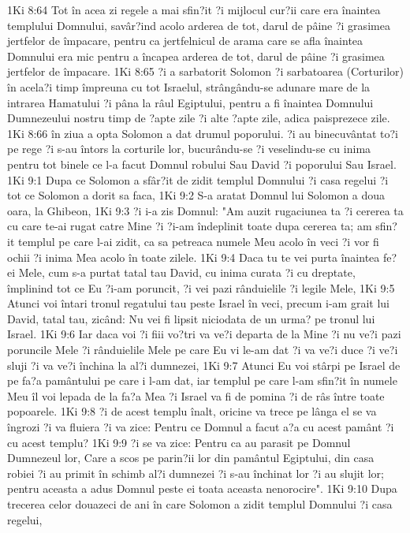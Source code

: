 1Ki 8:64  Tot în acea zi regele a mai sfin?it ?i mijlocul cur?ii care era înaintea templului Domnului, savâr?ind acolo arderea de tot, darul de pâine ?i grasimea jertfelor de împacare, pentru ca jertfelnicul de arama care se afla înaintea Domnului era mic pentru a încapea arderea de tot, darul de pâine ?i grasimea jertfelor de împacare.
1Ki 8:65  ?i a sarbatorit Solomon ?i sarbatoarea (Corturilor) în acela?i timp împreuna cu tot Israelul, strângându-se adunare mare de la intrarea Hamatului ?i pâna la râul Egiptului, pentru a fi înaintea Domnului Dumnezeului nostru timp de ?apte zile ?i alte ?apte zile, adica paisprezece zile.
1Ki 8:66  în ziua a opta Solomon a dat drumul poporului. ?i au binecuvântat to?i pe rege ?i s-au întors la corturile lor, bucurându-se ?i veselindu-se cu inima pentru tot binele ce l-a facut Domnul robului Sau David ?i poporului Sau Israel.
1Ki 9:1  Dupa ce Solomon a sfâr?it de zidit templul Domnului ?i casa regelui ?i tot ce Solomon a dorit sa faca,
1Ki 9:2  S-a aratat Domnul lui Solomon a doua oara, la Ghibeon,
1Ki 9:3  ?i i-a zis Domnul: "Am auzit rugaciunea ta ?i cererea ta cu care te-ai rugat catre Mine ?i ?i-am îndeplinit toate dupa cererea ta; am sfin?it templul pe care l-ai zidit, ca sa petreaca numele Meu acolo în veci ?i vor fi ochii ?i inima Mea acolo în toate zilele.
1Ki 9:4  Daca tu te vei purta înaintea fe?ei Mele, cum s-a purtat tatal tau David, cu inima curata ?i cu dreptate, împlinind tot ce Eu ?i-am poruncit, ?i vei pazi rânduielile ?i legile Mele,
1Ki 9:5  Atunci voi întari tronul regatului tau peste Israel în veci, precum i-am grait lui David, tatal tau, zicând: Nu vei fi lipsit niciodata de un urma? pe tronul lui Israel.
1Ki 9:6  Iar daca voi ?i fiii vo?tri va ve?i departa de la Mine ?i nu ve?i pazi poruncile Mele ?i rânduielile Mele pe care Eu vi le-am dat ?i va ve?i duce ?i ve?i sluji ?i va ve?i închina la al?i dumnezei,
1Ki 9:7  Atunci Eu voi stârpi pe Israel de pe fa?a pamântului pe care i l-am dat, iar templul pe care l-am sfin?it în numele Meu îl voi lepada de la fa?a Mea ?i Israel va fi de pomina ?i de râs între toate popoarele.
1Ki 9:8  ?i de acest templu înalt, oricine va trece pe lânga el se va îngrozi ?i va fluiera ?i va zice: Pentru ce Domnul a facut a?a cu acest pamânt ?i cu acest templu?
1Ki 9:9  ?i se va zice: Pentru ca au parasit pe Domnul Dumnezeul lor, Care a scos pe parin?ii lor din pamântul Egiptului, din casa robiei ?i au primit în schimb al?i dumnezei ?i s-au închinat lor ?i au slujit lor; pentru aceasta a adus Domnul peste ei toata aceasta nenorocire".
1Ki 9:10  Dupa trecerea celor douazeci de ani în care Solomon a zidit templul Domnului ?i casa regelui,
